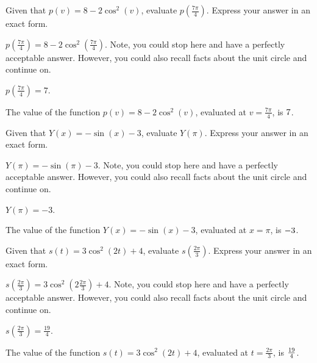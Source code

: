 \begin{shuffle} %
\begin{exercise}
Given that $p(v)=8-2 \cos ^2(v)$, evaluate $p\left(\frac{7 \pi }{4}\right)$. Express your answer in an exact form.
\begin{solution}
\begin{hint}
$p\left(\frac{7 \pi }{4}\right)=8-2 \cos ^2\left(\frac{7 \pi }{4}\right)$. Note, you could stop here and have a perfectly acceptable answer. However, you could also recall facts about the unit circle and continue on. 
\end{hint}
\begin{hint}
$p\left(\frac{7 \pi }{4}\right)=7$.
\end{hint}
The value of the function $p(v)=8-2 \cos ^2(v)$, evaluated at $v=\frac{7 \pi }{4}$, is ${7}$.
\end{solution}
\end{exercise}

\begin{exercise}
Given that $Y(x)=-\sin (x)-3$, evaluate $Y\left(\pi\right)$. Express your answer in an exact form.
\begin{solution}
\begin{hint}
$Y\left(\pi\right)=-\sin \left(\pi\right)-3$. Note, you could stop here and have a perfectly acceptable answer. However, you could also recall facts about the unit circle and continue on. 
\end{hint}
\begin{hint}
$Y\left(\pi\right)=-3$.
\end{hint}
The value of the function $Y(x)=-\sin (x)-3$, evaluated at $x=\pi$, is ${-3}$.
\end{solution}
\end{exercise}

\begin{exercise}
Given that $s(t)=3 \cos ^2(2 t)+4$, evaluate $s\left(\frac{2 \pi }{3}\right)$. Express your answer in an exact form.
\begin{solution}
\begin{hint}
$s\left(\frac{2 \pi }{3}\right)=3 \cos ^2\left(2 \frac{2 \pi }{3}\right)+4$. Note, you could stop here and have a perfectly acceptable answer. However, you could also recall facts about the unit circle and continue on. 
\end{hint}
\begin{hint}
$s\left(\frac{2 \pi }{3}\right)=\frac{19}{4}$.
\end{hint}
The value of the function $s(t)=3 \cos ^2(2 t)+4$, evaluated at $t=\frac{2 \pi }{3}$, is ${\frac{19}{4}}$.
\end{solution}
\end{exercise}


\end{shuffle}
